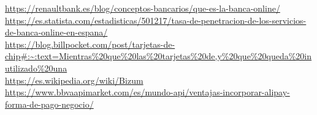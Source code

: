 

\url{https://renaultbank.es/blog/conceptos-bancarios/que-es-la-banca-online/}
\\
\url{https://es.statista.com/estadisticas/501217/tasa-de-penetracion-de-los-servicios-de-banca-online-en-espana/}
\\
\url{https://blog.billpocket.com/post/tarjetas-de-chip#:~:text=Mientras%20que%20las%20tarjetas%20de,y%20que%20queda%20inutilizado%20una}
\\
\url{https://es.wikipedia.org/wiki/Bizum}
\\
\url{https://www.bbvaapimarket.com/es/mundo-api/ventajas-incorporar-alipay-forma-de-pago-negocio/}